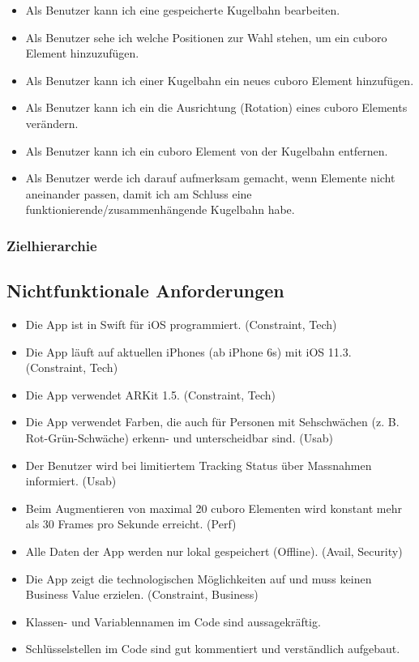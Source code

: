 \begin{enumerate}
\begin{itemize}
		\item Als Benutzer kann ich eine gespeicherte Kugelbahn bearbeiten.
		\item Als Benutzer sehe ich welche Positionen zur Wahl stehen, um ein cuboro Element hinzuzufügen.
		\item Als Benutzer kann ich einer Kugelbahn ein neues cuboro Element hinzufügen.
		\item Als Benutzer kann ich ein die Ausrichtung (Rotation) eines cuboro Elements verändern.
		\item Als Benutzer kann ich ein cuboro Element von der Kugelbahn entfernen.
		\item Als Benutzer werde ich darauf aufmerksam gemacht, wenn Elemente nicht aneinander passen, damit ich am Schluss eine funktionierende/zusammenhängende Kugelbahn habe.
	\end{itemize}
\end{enumerate}

\subsubsection{Zielhierarchie}

\subsection{Nichtfunktionale Anforderungen}
\begin{itemize}
	\item Die App ist in Swift für iOS programmiert. (Constraint, Tech)
	\item Die App läuft auf aktuellen iPhones (ab iPhone 6s) mit iOS 11.3. (Constraint, Tech)
	\item Die App verwendet ARKit 1.5. (Constraint, Tech)
	\item Die App verwendet Farben, die auch für Personen mit Sehschwächen (z. B. Rot-Grün-Schwäche) erkenn- und unterscheidbar sind. (Usab)
	\item Der Benutzer wird bei limitiertem Tracking Status über Massnahmen informiert. (Usab)
	\item Beim Augmentieren von maximal 20 cuboro Elementen wird konstant mehr als 30 Frames pro Sekunde erreicht. (Perf)
	\item Alle Daten der App werden nur lokal gespeichert (Offline). (Avail, Security)
	\item Die App zeigt die technologischen Möglichkeiten auf und muss keinen Business Value erzielen. (Constraint, Business)
	\item Klassen- und Variablennamen im Code sind aussagekräftig.
	\item Schlüsselstellen im Code sind gut kommentiert und verständlich aufgebaut.
\end{itemize}


